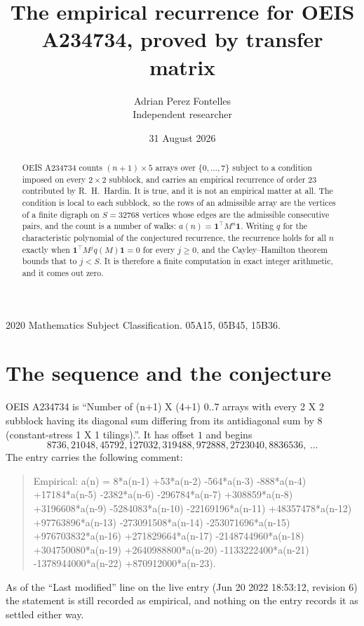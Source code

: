 \documentclass[11pt,a4paper]{article}
\title{The empirical recurrence for OEIS A234734, proved by transfer matrix}
\author{Adrian Perez Fontelles\\ \small Independent researcher}
\date{31 August 2026}
\theoremstyle{plain}
\theoremstyle{definition}
\begin{document}
\maketitle

\begin{abstract}
OEIS A234734 counts $(n+1)\times5$ arrays over $\{0,\dots,7\}$ subject to a condition imposed on
every $2\times2$ subblock, and carries an empirical recurrence of order $23$ contributed
by R.~H.~Hardin. It is true, and it is not an empirical matter at all. The condition is local
to each subblock, so the rows of an admissible array are the vertices of a finite digraph
on $S=32768$ vertices whose edges are the admissible consecutive pairs, and the count is a
number of walks: $a(n)=\mathbf{1}^{\!\top}M^{n}\mathbf{1}$. Writing $q$
for the characteristic polynomial of the conjectured recurrence, the recurrence holds for all
$n$ exactly when $\mathbf{1}^{\!\top}M^{j}q(M)\mathbf{1}=0$ for every $j\ge0$, and the
Cayley--Hamilton theorem bounds that to $j<S$. It is therefore a finite computation in exact
integer arithmetic, and it comes out zero.
\end{abstract}

\noindent\small 2020 Mathematics Subject Classification. 05A15, 05B45, 15B36.\normalsize

\section{The sequence and the conjecture}

OEIS A234734 is ``Number of (n+1) X (4+1) 0..7 arrays with every 2 X 2 subblock having its diagonal sum differing from its antidiagonal sum by 8 (constant-stress 1 X 1 tilings).''. It has offset $1$ and begins
\[
8736, 21048, 45792, 127032, 319488, 972888, 2723040, 8836536,\ \dots
\]
The entry carries the following comment:
\begin{quote}\small
Empirical: a(n) = 8*a(n-1) +53*a(n-2) -564*a(n-3) -888*a(n-4) +17184*a(n-5) -2382*a(n-6) -296784*a(n-7) +308859*a(n-8) +3196608*a(n-9) -5284083*a(n-10) -22169196*a(n-11) +48357478*a(n-12) +97763896*a(n-13) -273091508*a(n-14) -253071696*a(n-15) +976703832*a(n-16) +271829664*a(n-17) -2148744960*a(n-18) +304750080*a(n-19) +2640988800*a(n-20) -1133222400*a(n-21) -1378944000*a(n-22) +870912000*a(n-23).
\end{quote}
As of the ``Last modified'' line on the live entry (Jun 20 2022 18:53:12, revision 6) the statement is
still recorded as empirical, and nothing on the entry records it as settled either way.
\end{document}
